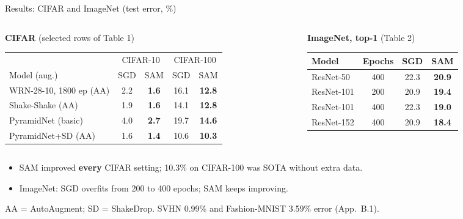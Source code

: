 \documentclass[aspectratio=169,10pt]{beamer}
\newcommand{\sh}[1]{\textcolor{sharp}{#1}}
\newcommand{\mt}[1]{\textcolor{muted}{#1}}
\newcommand{\source}[1]{\par\vfill{\scriptsize\mt{#1}}}
\newcommand{\best}[1]{\textbf{#1}}
\begin{document}
\begin{frame}{Results: CIFAR and ImageNet (test error, \%)}
\begin{columns}[T]
\begin{column}{0.55\textwidth}
\centering\footnotesize
\textbf{CIFAR} \mt{(selected rows of Table 1)}\\[3pt]
\begin{tabular}{@{}lcccc@{}}
\toprule
& \multicolumn{2}{c}{CIFAR-10} & \multicolumn{2}{c}{CIFAR-100}\\
\cmidrule(lr){2-3}\cmidrule(lr){4-5}
Model (aug.) & SGD & SAM & SGD & SAM \\
\midrule
WRN-28-10, 1800 ep (AA) & 2.2 & \best{1.6} & 16.1 & \best{12.8}\\
Shake-Shake (AA) & 1.9 & \best{1.6} & 14.1 & \best{12.8}\\
PyramidNet (basic) & 4.0 & \best{2.7} & 19.7 & \best{14.6}\\
PyramidNet+SD (AA) & 1.6 & \best{1.4} & 10.6 & \best{10.3}\\
\bottomrule
\end{tabular}
\end{column}
\begin{column}{0.42\textwidth}
\centering\footnotesize
\textbf{ImageNet, top-1} \mt{(Table 2)}\\[3pt]
\begin{tabular}{@{}lccc@{}}
\toprule
Model & Epochs & SGD & SAM\\
\midrule
ResNet-50 & 400 & 22.3 & \best{20.9}\\
ResNet-101 & 200 & 20.9 & \best{19.4}\\
ResNet-101 & 400 & 22.3 & \best{19.0}\\
ResNet-152 & 400 & 20.9 & \best{18.4}\\
\bottomrule
\end{tabular}
\end{column}
\end{columns}
\vspace{0.8em}
\begin{itemize}
  \item SAM improved \textbf{every} CIFAR setting; 10.3\% on CIFAR-100 was SOTA without extra data.
  \item ImageNet: SGD \sh{overfits} from 200 to 400 epochs; SAM keeps improving.
\end{itemize}
\source{AA = AutoAugment; SD = ShakeDrop. SVHN 0.99\% and Fashion-MNIST 3.59\% error (App.\ B.1).}
\end{frame}
\end{document}
